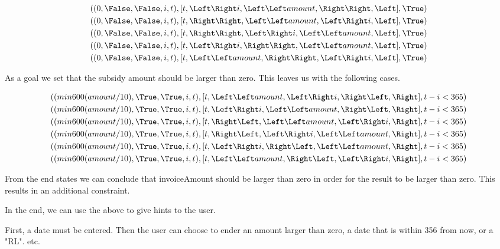 \begin{align*}
  ((                  0&, \False,\False, i, t),[t,\Left \Right i, \Left \Left amount, \Right \Right, \Left],\True)\\
  ((                  0&, \False,\False, i, t),[t,\Right \Right,\Left \Left amount, \Left \Right i, \Left],\True)\\
  ((                  0&, \False,\False, i, t),[t,\Right \Right, \Left \Right i, \Left \Left amount, \Left],\True)\\
  ((                  0&, \False,\False, i, t),[t, \Left \Right i, \Right \Right, \Left \Left amount, \Left],\True)\\
  ((                  0&, \False,\False, i, t),[t, \Left \Left amount, \Right \Right, \Left \Right i, \Left],\True)\\
\end{align*}


As a goal we set that the subsidy amount should be larger than zero. This leaves us with the following cases.


\begin{align*}
  ((min 600 (amount/10)&,  \True, \True, i, t),[t,\Left \Left amount,     \Left \Right i, \Right \Left, \Right],t-i<365)\\
  ((min 600 (amount/10)&,  \True, \True, i, t),[t,    \Left \Right i, \Left \Left amount, \Right \Left, \Right],t-i<365)\\
  ((min 600 (amount/10)&,  \True, \True, i, t),[t,      \Right \Left, \Left \Left amount, \Left \Right i, \Right],t-i<365)\\
  ((min 600 (amount/10)&,  \True, \True, i, t),[t,      \Right \Left, \Left \Right i, \Left \Left amount, \Right],t-i<365)\\
  ((min 600 (amount/10)&,  \True, \True, i, t),[t,    \Left \Right i, \Right \Left, \Left \Left amount, \Right],t-i<365)\\
  ((min 600 (amount/10)&,  \True, \True, i, t),[t,\Left \Left amount, \Right \Left, \Left \Right i, \Right],t-i<365)\\
\end{align*}

From the end states we can conclude that invoiceAmount should be larger than zero in order for the result to be larger than zero. This results in an additional constraint.

In the end, we can use the above to give hints to the user.

First, a date must be entered. Then the user can choose to ender an amount larger than zero, a date that is within 356 from now, or a "RL".
etc.
